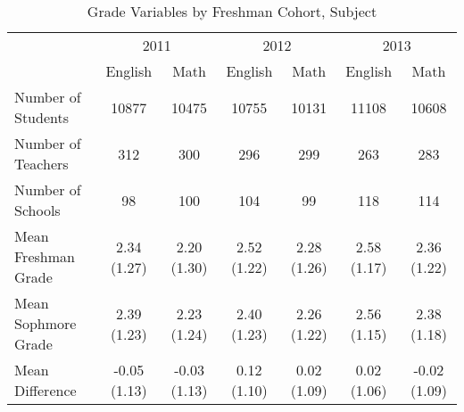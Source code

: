 \begin{table}

\caption{\label{tab:table_freq}Grade Variables by Freshman Cohort, Subject\label{tab:table_freq}}
\centering
\begin{tabular}[t]{lcccccc}
\toprule
\multicolumn{1}{c}{ } & \multicolumn{2}{c}{2011} & \multicolumn{2}{c}{2012} & \multicolumn{2}{c}{2013} \\
\cmidrule(l{3pt}r{3pt}){2-3} \cmidrule(l{3pt}r{3pt}){4-5} \cmidrule(l{3pt}r{3pt}){6-7}
  & English & Math & English & Math & English & Math\\
\midrule
Number of Students & 10877 & 10475 & 10755 & 10131 & 11108 & 10608\\
Number of Teachers & 312 & 300 & 296 & 299 & 263 & 283\\
Number of Schools & 98 & 100 & 104 & 99 & 118 & 114\\
\addlinespace
Mean Freshman Grade & 2.34 (1.27) & 2.20 (1.30) & 2.52 (1.22) & 2.28 (1.26) & 2.58 (1.17) & 2.36 (1.22)\\
Mean Sophmore Grade & 2.39 (1.23) & 2.23 (1.24) & 2.40 (1.23) & 2.26 (1.22) & 2.56 (1.15) & 2.38 (1.18)\\
Mean Difference & -0.05 (1.13) & -0.03 (1.13) & 0.12 (1.10) & 0.02 (1.09) & 0.02 (1.06) & -0.02 (1.09)\\
\bottomrule
\end{tabular}
\end{table}
